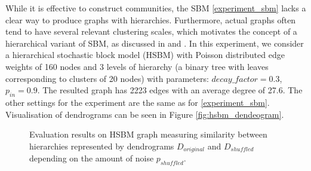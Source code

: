 While it is effective to construct communities, the SBM \ref{experiment_sbm} lacks a clear way to produce graphs with hierarchies. Furthermore, actual graphs often tend to have several relevant clustering scales, which motivates the concept of a hierarchical variant of SBM, as discussed in \cite{charpentier2019master} and \cite{lyzinski2016community}. In this experiment, we consider a hierarchical stochastic block model (HSBM) with Poisson distributed edge weights of 160 nodes and 3 levels of hierarchy (a binary tree with leaves corresponding to clusters of 20 nodes) with parameters: $decay\_factor=0.3$, $p_{in}=0.9$. The resulted graph has 2223 edges with an average degree of 27.6. The other settings for the experiment are the same as for \ref{experiment_sbm}. Visualisation of dendrograms can be seen in Figure \ref{fig:hsbm_dendeogram}.


\begin{figure}[H]
	\centering
	\caption{Evaluation results on HSBM graph measuring similarity between hierarchies represented by dendrograms $D_{original}$ and $D_{shuffled}$ depending on the amount of noise $p_{shuffled}$.}
	\label{fig:hsbm_results}
\end{figure}


